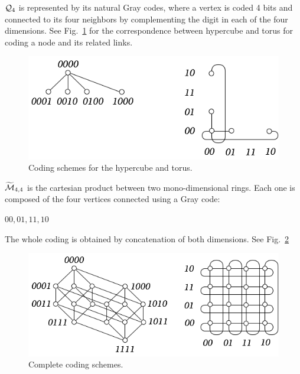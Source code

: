 \begin{itemize}
$\mbox{$\cal Q$}_4$ is represented by its natural Gray codes,
where a vertex is coded 4 bits and connected to its four neighbors by complementing 
the digit in each of the four dimensions.
See Fig.~\ref{fig:IsomorphismCodingPrinciple} for the correspondence between hypercube and torus for coding a node and its related links.
\medskip
 \begin{figure}[hbt]
\begin{center}
       \includegraphics[scale=0.4]{FiguresGraph/IsomorphismEx2}
       \caption{Coding schemes for the hypercube and torus.}
  \label{fig:IsomorphismCodingPrinciple}
\end{center}
\end{figure}

$\widetilde{\mbox{$\cal M$}}_{4,4}$ is the cartesian product between two mono-dimensional rings.
Each one is composed of the four vertices connected using a Gray code:

$00, 01, 11, 10$

The whole coding is obtained by concatenation of both dimensions.
See Fig.~\ref{fig:IsomorphismCodingComplete}
 \begin{figure}[hbt]
\begin{center}
       \includegraphics[scale=0.4]{FiguresGraph/IsomorphismEx1}
       \caption{Complete coding schemes.}
  \label{fig:IsomorphismCodingComplete}
\end{center}
\end{figure}


\end{itemize}
